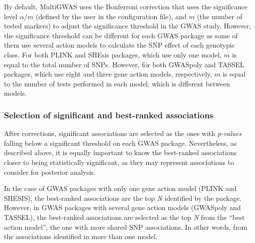 \documentclass{article}
\begin{document}
By default, MultiGWAS uses the Bonferroni correction that uses the significance level  $\alpha/m$ (defined by the user in the configuration file), and $m$ (the number of tested markers) to adjust the significance threshold in the GWAS study. However, the significance threshold can be different for each GWAS package as some of them use several action models to calculate the SNP effect of each genotypic class. For both PLINK and SHEsis packages, which use only one model, $m$ is equal to the total number of SNPs. However, for both GWASpoly and TASSEL packages, which use eight and three gene action models, respectively, $m$ is equal to the number of tests performed in each model, which is different between models. 

\subsubsection{Selection of significant and best-ranked associations}
After corrections, significant associations are selected as the ones with \emph{p-values} falling below a significant threshold on each GWAS package. Nevertheless, as described above, it is equally important to know the best-ranked associations closer to being statistically significant, as they may represent associations to consider for posterior analysis. 

In the case of GWAS packages with only one gene action model (PLINK and SHESIS), the best-ranked associations are the top \emph{N} identified by the package. However, in GWAS packages with several gene action models (GWASpoly and TASSEL), the best-ranked associations are selected as the top \emph{N} from the ``best action model'', the one with more shared SNP associations. In other words, from the associations identified in more than one model. \color{black}
\end{document}
